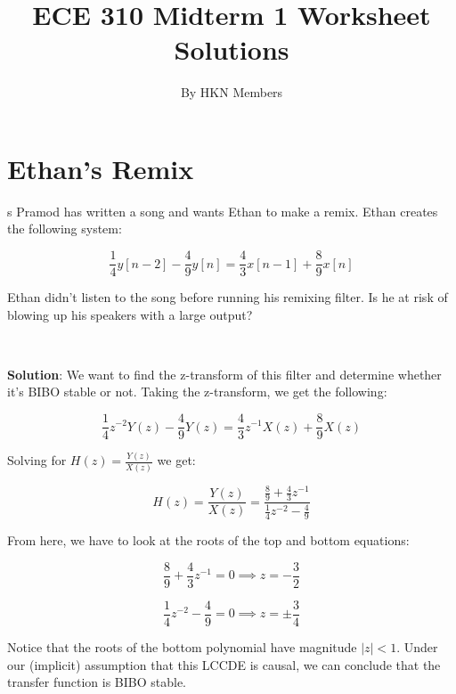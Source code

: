\documentclass{article}
\title{ECE 310 Midterm 1 Worksheet Solutions}
\author{By HKN Members}
\date{}
\begin{document}
\maketitle

\section{Ethan's Remix}s
Pramod has written a song and wants Ethan to make a remix. Ethan creates the following system:

$$\frac{1}{4} y[n-2] - \frac{4}{9} y[n] = \frac{4}{3} x[n-1] + \frac{8}{9} x[n]$$

\noindent Ethan didn't listen to the song before running his remixing filter. Is he at risk of blowing up his speakers with a large output?

\

\noindent \textbf{Solution}: We want to find the z-transform of this filter and determine whether it's BIBO stable or not. Taking the z-transform, we get the following:

$$\frac{1}{4}z^{-2}Y(z) - \frac{4}{9}Y(z) = \frac{4}{3}z^{-1}X(z) + \frac{8}{9}X(z)$$

\noindent Solving for $H(z) = \frac{Y(z)}{X(z)}$ we get:

$$H(z) = \frac{Y(z)}{X(z)} = \frac{\frac{8}{9} + \frac{4}{3}z^{-1}}{\frac{1}{4}z^{-2} - \frac{4}{9}}$$

\noindent From here, we have to look at the roots of the top and bottom equations:

$$\frac{8}{9} + \frac{4}{3}z^{-1} = 0 \implies z = -\frac{3}{2}$$

$$\frac{1}{4}z^{-2} - \frac{4}{9} = 0 \implies z = \pm \frac{3}{4}$$

\noindent Notice that the roots of the bottom polynomial have magnitude $|z| < 1$. Under our (implicit) assumption that this LCCDE is causal, we can conclude that the transfer function is BIBO stable.

\newpage
\end{document}
